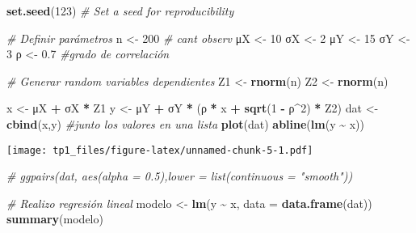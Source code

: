 \documentclass[
]{article}
\newenvironment{Shaded}{\begin{snugshade}}{\end{snugshade}}
\newcommand{\AttributeTok}[1]{\textcolor[rgb]{0.13,0.29,0.53}{#1}}
\newcommand{\CommentTok}[1]{\textcolor[rgb]{0.56,0.35,0.01}{\textit{#1}}}
\newcommand{\DecValTok}[1]{\textcolor[rgb]{0.00,0.00,0.81}{#1}}
\newcommand{\FloatTok}[1]{\textcolor[rgb]{0.00,0.00,0.81}{#1}}
\newcommand{\FunctionTok}[1]{\textcolor[rgb]{0.13,0.29,0.53}{\textbf{#1}}}
\newcommand{\NormalTok}[1]{#1}
\newcommand{\OtherTok}[1]{\textcolor[rgb]{0.56,0.35,0.01}{#1}}
\newcommand{\SpecialCharTok}[1]{\textcolor[rgb]{0.81,0.36,0.00}{\textbf{#1}}}
\begin{document}
\begin{Shaded}
\begin{Highlighting}[]
\FunctionTok{set.seed}\NormalTok{(}\DecValTok{123}\NormalTok{)  }\CommentTok{\# Set a seed for reproducibility}

\CommentTok{\# Definir parámetros}
\NormalTok{n }\OtherTok{\textless{}{-}} \DecValTok{200} \CommentTok{\# cant observ}
\NormalTok{μX }\OtherTok{\textless{}{-}} \DecValTok{10}
\NormalTok{σX }\OtherTok{\textless{}{-}} \DecValTok{2}
\NormalTok{μY }\OtherTok{\textless{}{-}} \DecValTok{15}
\NormalTok{σY }\OtherTok{\textless{}{-}} \DecValTok{3}
\NormalTok{ρ }\OtherTok{\textless{}{-}} \FloatTok{0.7} \CommentTok{\#grado de correlación}

\CommentTok{\# Generar random variables dependientes}
\NormalTok{Z1 }\OtherTok{\textless{}{-}} \FunctionTok{rnorm}\NormalTok{(n)}
\NormalTok{Z2 }\OtherTok{\textless{}{-}} \FunctionTok{rnorm}\NormalTok{(n)}

\NormalTok{x }\OtherTok{\textless{}{-}}\NormalTok{ μX }\SpecialCharTok{+}\NormalTok{ σX }\SpecialCharTok{*}\NormalTok{ Z1}
\NormalTok{y }\OtherTok{\textless{}{-}}\NormalTok{ μY }\SpecialCharTok{+}\NormalTok{ σY }\SpecialCharTok{*}\NormalTok{ (ρ }\SpecialCharTok{*}\NormalTok{ x }\SpecialCharTok{+} \FunctionTok{sqrt}\NormalTok{(}\DecValTok{1} \SpecialCharTok{{-}}\NormalTok{ ρ}\SpecialCharTok{\^{}}\DecValTok{2}\NormalTok{) }\SpecialCharTok{*}\NormalTok{ Z2)}
\NormalTok{dat }\OtherTok{\textless{}{-}} \FunctionTok{cbind}\NormalTok{(x,y) }\CommentTok{\#junto los valores en una lista}
\FunctionTok{plot}\NormalTok{(dat)}
\FunctionTok{abline}\NormalTok{(}\FunctionTok{lm}\NormalTok{(y }\SpecialCharTok{\textasciitilde{}}\NormalTok{ x))}
\end{Highlighting}
\end{Shaded}

\texttt{[image: tp1\_files/figure-latex/unnamed-chunk-5-1.pdf]}

\begin{Shaded}
\begin{Highlighting}[]
\CommentTok{\# ggpairs(dat, aes(alpha = 0.5),lower = list(continuous = "smooth"))}
\end{Highlighting}
\end{Shaded}

\begin{Shaded}
\begin{Highlighting}[]
\CommentTok{\# Realizo regresión lineal }
\NormalTok{modelo }\OtherTok{\textless{}{-}} \FunctionTok{lm}\NormalTok{(y }\SpecialCharTok{\textasciitilde{}}\NormalTok{ x, }\AttributeTok{data =} \FunctionTok{data.frame}\NormalTok{(dat))}
\FunctionTok{summary}\NormalTok{(modelo)}
\end{Highlighting}
\end{Shaded}
\end{document}
